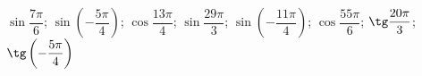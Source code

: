 \begin{ex}[type=calculate]
	\begin{condition}
		 \( \sin\dfrac{7\pi}{6} \); \( \sin\left( -\dfrac{5\pi}{4} \right) \); \( \cos\dfrac{13\pi}{4} \); \( \sin\dfrac{29\pi}{3} \); \( \sin\left( -\dfrac{11\pi}{4}  \right)\); \( \cos\dfrac{55\pi}{6} \);  \( \tg\dfrac{20\pi}{3} \); \( \tg\left( -\dfrac{5\pi}{4}  \right)\)
	\end{condition}
\end{ex}